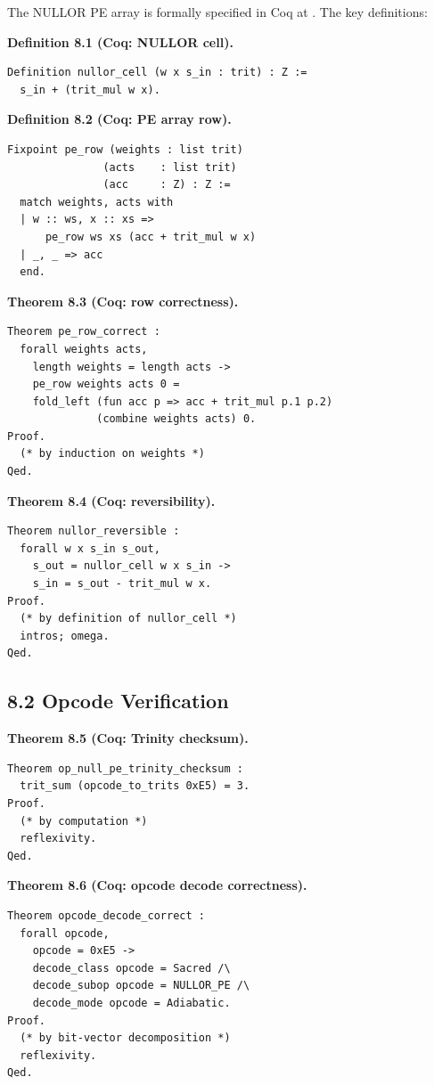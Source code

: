 The NULLOR PE array is formally specified in Coq at
. The key
definitions:

\textbf{Definition 8.1 (Coq: NULLOR cell).}
\begin{verbatim}
Definition nullor_cell (w x s_in : trit) : Z :=
  s_in + (trit_mul w x).
\end{verbatim}

\textbf{Definition 8.2 (Coq: PE array row).}
\begin{verbatim}
Fixpoint pe_row (weights : list trit)
               (acts    : list trit)
               (acc     : Z) : Z :=
  match weights, acts with
  | w :: ws, x :: xs =>
      pe_row ws xs (acc + trit_mul w x)
  | _, _ => acc
  end.
\end{verbatim}

\textbf{Theorem 8.3 (Coq: row correctness).}
\begin{verbatim}
Theorem pe_row_correct :
  forall weights acts,
    length weights = length acts ->
    pe_row weights acts 0 =
    fold_left (fun acc p => acc + trit_mul p.1 p.2)
              (combine weights acts) 0.
Proof.
  (* by induction on weights *)
Qed.
\end{verbatim}

\textbf{Theorem 8.4 (Coq: reversibility).}
\begin{verbatim}
Theorem nullor_reversible :
  forall w x s_in s_out,
    s_out = nullor_cell w x s_in ->
    s_in = s_out - trit_mul w x.
Proof.
  (* by definition of nullor_cell *)
  intros; omega.
Qed.
\end{verbatim}

\subsection{8.2 Opcode Verification}

\textbf{Theorem 8.5 (Coq: Trinity checksum).}
\begin{verbatim}
Theorem op_null_pe_trinity_checksum :
  trit_sum (opcode_to_trits 0xE5) = 3.
Proof.
  (* by computation *)
  reflexivity.
Qed.
\end{verbatim}

\textbf{Theorem 8.6 (Coq: opcode decode correctness).}
\begin{verbatim}
Theorem opcode_decode_correct :
  forall opcode,
    opcode = 0xE5 ->
    decode_class opcode = Sacred /\
    decode_subop opcode = NULLOR_PE /\
    decode_mode opcode = Adiabatic.
Proof.
  (* by bit-vector decomposition *)
  reflexivity.
Qed.
\end{verbatim}

